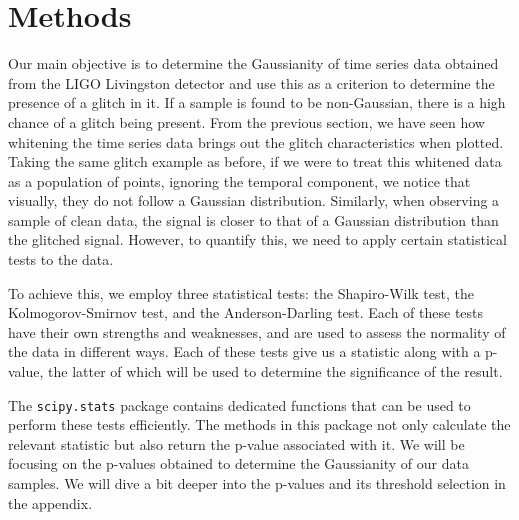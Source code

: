 \documentclass[12pt]{article}
\begin{document}
\section{Methods}\label{Methods}\label{Methods}

Our main objective is to determine the Gaussianity of time series data obtained from the LIGO Livingston detector and use this as a criterion to determine the presence of a glitch in it. If a sample is found to be non-Gaussian, there is a high chance of a glitch being present. From the previous section, we have seen how whitening the time series data brings out the glitch characteristics when plotted. Taking the same glitch example as before, if we were to treat this whitened data as a population of points, ignoring the temporal component, we notice that visually, they do not follow a Gaussian distribution. Similarly, when observing a sample of clean data, the signal is closer to that of a Gaussian distribution than the glitched signal. However, to quantify this, we need to apply certain statistical tests to the data.


\medskip
\noindent To achieve this, we employ three statistical tests: the Shapiro-Wilk test, the Kolmogorov-Smirnov test, and the Anderson-Darling test. Each of these tests have their own strengths and weaknesses, and are used to assess the normality of the data in different ways. Each of these tests give us a statistic along with a p-value, the latter of which will be used to determine the significance of the result.


\medskip
\noindent The \texttt{scipy.stats} package contains dedicated functions that can be used to perform these tests efficiently. The methods in this package not only calculate the relevant statistic but also return the p-value associated with it. We will be focusing on the p-values obtained to determine the Gaussianity of our data samples. We will dive a bit deeper into the p-values and its threshold selection in the appendix.
\end{document}
